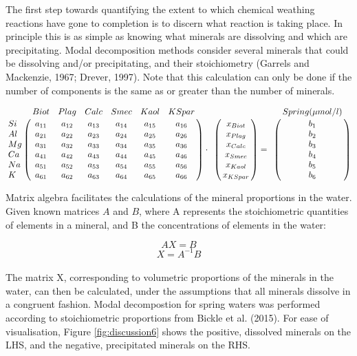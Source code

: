 The first step towards quantifying the extent to which chemical weathing reactions have gone to completion is to discern what reaction is taking place. In principle this is as simple as knowing what minerals are dissolving and which are precipitating. Modal decomposition methods consider several minerals that could be dissolving and/or precipitating, and their stoichiometry (Garrels and Mackenzie, 1967; Drever, 1997). Note that this calculation can only be done if the number of components is the same as or greater than the number of minerals.


\begin{center}
\[
  \begin{bordermatrix}
{ & Biot & Plag & Calc & Smec & Kaol & KSpar \cr
Si  & a_{11}  & a_{12}  & a_{13}  & a_{14}  & a_{15}  & a_{16}  \cr
Al  & a_{21}  & a_{22}  & a_{23}  & a_{24}  & a_{25}  & a_{26}  \cr
Mg  & a_{31}  & a_{32}  & a_{33}  & a_{34}  & a_{35}  & a_{36}  \cr
Ca  & a_{41}  & a_{42}  & a_{43}  & a_{44}  & a_{45}  & a_{46}  \cr
Na  & a_{51}  & a_{52}  & a_{53}  & a_{54}  & a_{55}  & a_{56}  \cr
K   & a_{61}  & a_{62}  & a_{63}  & a_{64}  & a_{65}  & a_{66}  \cr}
  \end{bordermatrix}
  \cdot
  \begin{bordermatrix}
{ &  \cr
  & x_{Biot} \cr
  & x_{Plag} \cr
  & x_{Calc} \cr
  & x_{Smec} \cr
  & x_{Kaol} \cr
  & x_{KSpar} \cr}
  \end{bordermatrix}
  =
  \begin{bordermatrix}
{ & Spring (\mu mol/l) \cr
  & b_1 \cr
  & b_2 \cr
  & b_3 \cr
  & b_4 \cr
  & b_5 \cr
  & b_6 \cr}
  \end{bordermatrix}
\]
\end{center}
\bsk

Matrix algebra facilitates the calculations of the mineral proportions in the water. Given known matrices \( A \) and \( B \), where A represents the stoichiometric quantities of elements in a mineral, and B the concentrations of elements in the water:

\begin{equation}
AX = B
\end{equation}
\begin{equation}
X = A^{-1}B
\end{equation}\\

The matrix X, corresponding to volumetric proportions of the minerals in the water, can then be calculated, under the assumptions that all minerals dissolve in a congruent fashion. Modal decompostion for spring waters was performed according to stoichiometric proportions from Bickle et al. (2015). For ease of visualisation, Figure \ref{fig:discussion6} shows the positive, dissolved minerals on the LHS, and the negative, precipitated minerals on the RHS.\\

